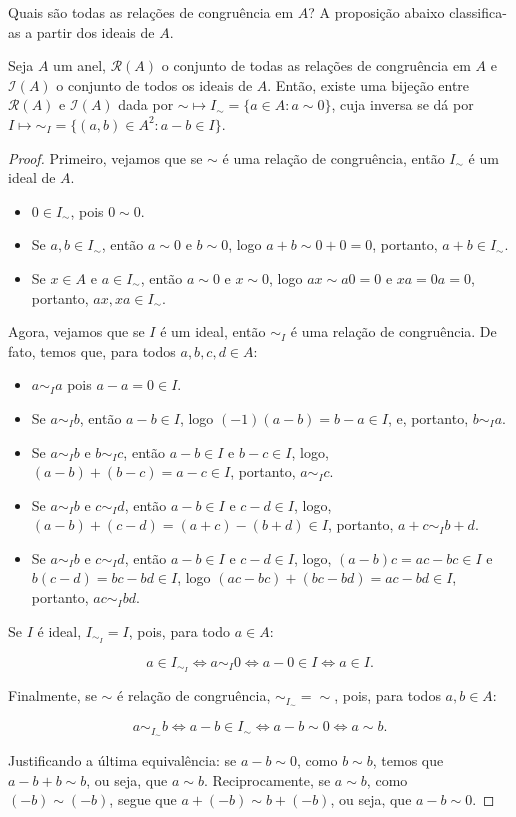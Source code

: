 Quais são todas as relações de congruência em $A$? A proposição abaixo classifica-as a partir dos ideais de $A$.
\begin{prop}
    Seja $A$ um anel, $\mathcal R(A)$ o conjunto de todas as relações de congruência em $A$ e $\mathcal I(A)$ o conjunto de todos os ideais de $A$. Então, existe uma bijeção entre $\mathcal R(A)$ e $\mathcal I(A)$ dada por
    $\sim \mapsto I_{\sim}=\{a \in A: a\sim 0\}$,
    cuja inversa se dá por $I\mapsto \sim_I=\{(a, b) \in A^2: a-b \in I\}$.
\end{prop}
\begin{proof}
Primeiro, vejamos que se $\sim$ é uma relação de congruência, então $I_\sim$ é um ideal de $A$.

\begin{itemize}
\item $0 \in I_\sim$, pois $0\sim 0$.
\item Se $a, b \in I_\sim$, então $a\sim 0$ e $b\sim 0$, logo $a+b\sim 0+0=0$, portanto, $a+b \in I_\sim$.
\item Se $x \in A$ e $a \in I_\sim$, então $a\sim 0$ e $x\sim 0$, logo $ax\sim a0=0$ e $xa=0a=0$, portanto, $ax, xa \in I_\sim$.
\end{itemize}

Agora, vejamos que se $I$ é um ideal, então $\sim_I$ é uma relação de congruência. De fato, temos que, para todos $a, b, c, d \in A$:
\begin{itemize}
    \item $a\sim_I a$ pois $a-a=0\in I$.
    \item Se $a\sim_I b$, então $a-b \in I$, logo $(-1)(a-b)=b-a\in I$, e, portanto, $b\sim_I a$.
    \item Se $a\sim_I b$ e $b\sim_I c$, então $a-b \in I$ e $b-c \in I$, logo, $(a-b)+(b-c)=a-c \in I$, portanto, $a\sim_I c$.
    \item Se $a\sim_I b$ e $c\sim_I d$, então $a-b \in I$ e $c-d \in I$, logo, $(a-b)+(c-d)=(a+c)-(b+d)\in I$, portanto, $a+c\sim_I b+d$.
    \item Se $a\sim_I b$ e $c\sim_I d$, então $a-b \in I$ e $c-d \in I$, logo, $(a-b)c=ac-bc\in I$ e $b(c-d)=bc-bd\in I$, logo $(ac-bc)+(bc-bd)=ac-bd\in I$, portanto, $ac\sim_I bd$.
    \end{itemize}

Se $I$ é ideal, $I_{\sim_I}=I$, pois, para todo $a\in A$:

$$a\in I_{\sim_I}\Leftrightarrow a\sim_I 0\Leftrightarrow a-0\in I\Leftrightarrow a\in I.$$

Finalmente, se $\sim$ é relação de congruência, $\sim_{I_\sim}=\sim$, pois, para todos $a, b \in A$:

$$a\sim_{I_\sim} b\Leftrightarrow a-b\in I_\sim \Leftrightarrow a-b\sim 0\Leftrightarrow a\sim b.$$

Justificando a última equivalência: se $a-b\sim 0$, como $b\sim b$, temos que $a-b+b\sim b$, ou seja, que $a\sim b$. Reciprocamente, se $a\sim b$, como $(-b)\sim (-b)$, segue que $a+(-b)\sim b+(-b)$, ou seja, que $a-b\sim 0$.
\end{proof}

